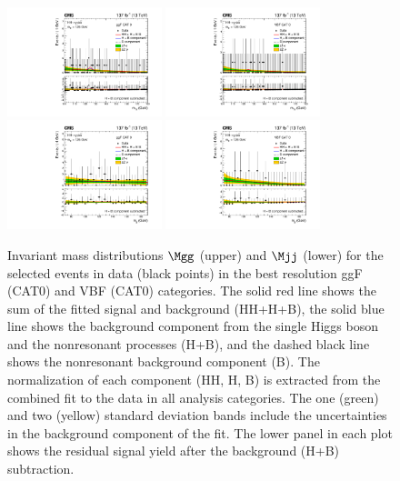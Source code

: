\documentclass[11pt,a4paper,cmspaper,final,collab]{cms-tdr}
\begin{document}
\begin{figure}[htbp]
 \centering
\includegraphics[width=0.40\textwidth]{Figure_008-a.pdf}
\includegraphics[width=0.40\textwidth]{Figure_008-b.pdf}\\
\includegraphics[width=0.40\textwidth]{Figure_008-c.pdf}
\includegraphics[width=0.40\textwidth]{Figure_008-d.pdf}\\
  \caption{
Invariant mass distributions $\Mgg$ (upper) and $\Mjj$ (lower) for the selected events in data (black points) in the best resolution ggF (CAT0) and VBF (CAT0) categories. The solid red line shows the sum of the fitted signal and background (HH+H+B), the solid blue line shows the background component from the single Higgs boson and the nonresonant processes (H+B), and the dashed black line shows the nonresonant background component (B). The normalization of each component (HH, H, B) is extracted from the combined fit to the data in all analysis categories. The one (green) and two (yellow) standard
  deviation bands include the uncertainties in the background component
  of the fit. The lower panel in each plot shows the residual signal yield after the
 background (H+B) subtraction.}
 \label{fig:sigBkgPlotsvbf}
\end{figure}
\end{document}
